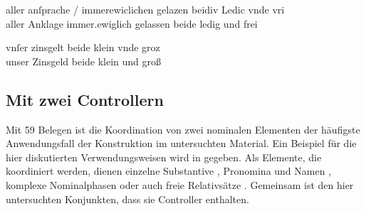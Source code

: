 \begin{exe}

\ex \label{ex:intraurkvar2}
	\begin{xlist}
	\ex \label{ex:intraurkvar2_1}
		\gll aller anſprache / immerewiclichen gelazen beidiv Ledic
				vnde vri \\
			aller Anklage {} immer.ewiglich gelassen beide ledig und frei \\
		\trans {}
			\parencites(Nr.~2293, Bamberg, 1295)[420,23]{cao3}

	\ex \label{ex:intraurkvar2_2}
		\gll vnſer zinsgelt beide klein vnde groz \\
			unser Zinsgeld beide klein und groß \\
		\trans {}
			\parencites(Nr.~2293, Bamberg, 1295)[420,30]{cao3}
	\end{xlist}
\end{exe}

\subsection{Mit zwei Controllern}
\label{subsec:caokonj2ctrl}

Mit 59 Belegen ist die Koordination von zwei nominalen Elementen der häufigste
Anwendungsfall der Konstruktion   im untersuchten Material. Ein Beispiel für die hier diskutierten
Verwendungsweisen wird in  gegeben. Als Elemente, die
koordiniert werden, dienen einzelne Substantive
, Pronomina und Namen
, komplexe Nominalphasen
 oder auch freie Relativsätze
. Gemeinsam ist den hier untersuchten Konjunkten, dass
sie Controller enthalten.

